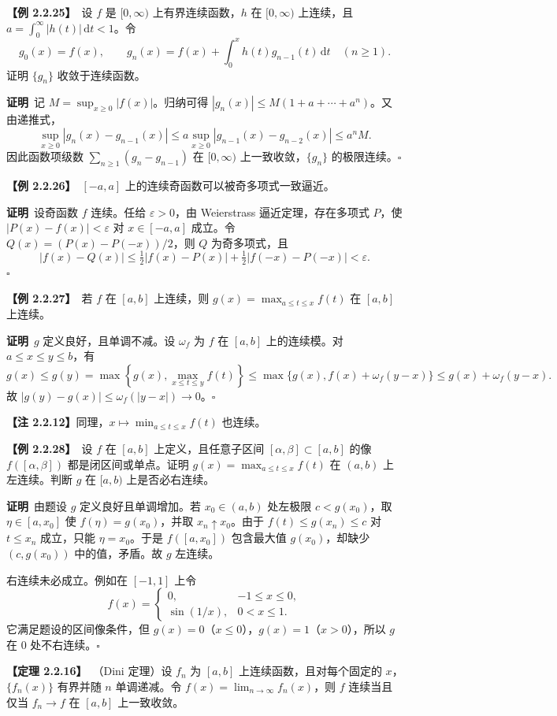 \documentclass[UTF8,a4paper,11pt]{ctexart}
\newcommand{\ex}[1]{\par\medskip\noindent\textbf{【例 #1】}\ }
\newcommand{\thm}[1]{\par\medskip\noindent\textbf{【定理 #1】}\ }
\newcommand{\pf}{\par\noindent\textbf{证明}\ }
\begin{document}
\ex{2.2.25}设 $f$ 是 $[0,\infty)$ 上有界连续函数，$h$ 在 $[0,\infty)$ 上连续，且 $a=\int_0^\infty|h(t)|\,\mathrm dt<1$。令
\[
g_0(x)=f(x),\qquad g_n(x)=f(x)+\int_0^x h(t)g_{n-1}(t)\,\mathrm dt\quad(n\ge1).
\]
证明 $\{g_n\}$ 收敛于连续函数。
\pf 记 $M=\sup_{x\ge0}|f(x)|$。归纳可得 $|g_n(x)|\le M(1+a+\cdots+a^n)$。又由递推式，
\[
\sup_{x\ge0}|g_n(x)-g_{n-1}(x)|
\le a\sup_{x\ge0}|g_{n-1}(x)-g_{n-2}(x)|
\le a^nM.
\]
因此函数项级数 $\sum_{n\ge1}(g_n-g_{n-1})$ 在 $[0,\infty)$ 上一致收敛，$\{g_n\}$ 的极限连续。\hfill$\square$

\ex{2.2.26}$[-a,a]$ 上的连续奇函数可以被奇多项式一致逼近。
\pf 设奇函数 $f$ 连续。任给 $\varepsilon>0$，由 Weierstrass 逼近定理，存在多项式 $P$，使 $|P(x)-f(x)|<\varepsilon$ 对 $x\in[-a,a]$ 成立。令 $Q(x)=(P(x)-P(-x))/2$，则 $Q$ 为奇多项式，且
\[
|f(x)-Q(x)|\le\tfrac12|f(x)-P(x)|+\tfrac12|f(-x)-P(-x)|<\varepsilon.
\]\hfill$\square$

\ex{2.2.27}若 $f$ 在 $[a,b]$ 上连续，则 $g(x)=\max_{a\le t\le x}f(t)$ 在 $[a,b]$ 上连续。
\pf $g$ 定义良好，且单调不减。设 $\omega_f$ 为 $f$ 在 $[a,b]$ 上的连续模。对 $a\le x\le y\le b$，有
\[
g(x)\le g(y)=\max\left\{g(x),\max_{x\le t\le y}f(t)\right\}
\le\max\{g(x),f(x)+\omega_f(y-x)\}
\le g(x)+\omega_f(y-x).
\]
故 $|g(y)-g(x)|\le\omega_f(|y-x|)\to0$。\hfill$\square$

\noindent\textbf{【注 2.2.12】}同理，$x\mapsto\min_{a\le t\le x}f(t)$ 也连续。

\ex{2.2.28}设 $f$ 在 $[a,b]$ 上定义，且任意子区间 $[\alpha,\beta]\subset[a,b]$ 的像 $f([\alpha,\beta])$ 都是闭区间或单点。证明 $g(x)=\max_{a\le t\le x}f(t)$ 在 $(a,b)$ 上左连续。判断 $g$ 在 $[a,b)$ 上是否必右连续。
\pf 由题设 $g$ 定义良好且单调增加。若 $x_0\in(a,b)$ 处左极限 $c<g(x_0)$，取 $\eta\in[a,x_0]$ 使 $f(\eta)=g(x_0)$，并取 $x_n\uparrow x_0$。由于 $f(t)\le g(x_n)\le c$ 对 $t\le x_n$ 成立，只能 $\eta=x_0$。于是 $f([a,x_0])$ 包含最大值 $g(x_0)$，却缺少 $(c,g(x_0))$ 中的值，矛盾。故 $g$ 左连续。

右连续未必成立。例如在 $[-1,1]$ 上令
\[
f(x)=\begin{cases}0,&-1\le x\le0,\\ \sin(1/x),&0<x\le1.\end{cases}
\]
它满足题设的区间像条件，但 $g(x)=0$（$x\le0$），$g(x)=1$（$x>0$），所以 $g$ 在 $0$ 处不右连续。\hfill$\square$

\thm{2.2.16}（Dini 定理）设 $f_n$ 为 $[a,b]$ 上连续函数，且对每个固定的 $x$，$\{f_n(x)\}$ 有界并随 $n$ 单调递减。令 $f(x)=\lim_{n\to\infty}f_n(x)$，则 $f$ 连续当且仅当 $f_n\to f$ 在 $[a,b]$ 上一致收敛。
\end{document}

